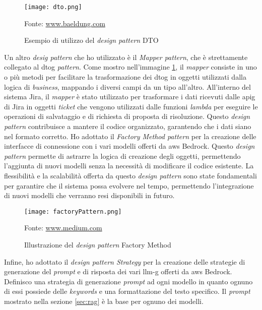 \begin{figure}[H]
    \centering
    \texttt{[image: dto.png]}
    \caption{Esempio di utilizzo del \textit{design pattern} DTO}
    \small Fonte: \href{https://www.baeldung.com/java-dto-pattern} {www.baeldung.com}
    \label{fig:dto}
\end{figure}
\noindent
Un altro \textit{desig pattern} che ho utilizzato è il \textit{Mapper pattern}, che è strettamente collegato al \gls{dtog} \textit{pattern}.  Come mostro nell'immagine \ref{fig:dto}, il \textit{mapper} consiste in uno o più metodi per facilitare la trasformazione dei \gls{dtog} in oggetti utilizzati dalla logica di \textit{business}, mappando i diversi campi da un tipo all’altro. All'interno del sistema Jira, il \textit{mapper} è stato utilizzato per trasformare i dati ricevuti dalle \gls{apig} di Jira in oggetti \textit{ticket} che vengono utilizzati dalle funzioni \textit{lambda} per eseguire le operazioni di salvataggio e di richiesta di proposta di risoluzione.
Questo \textit{design pattern} contribuisce a mantere il codice organizzato, garantendo che i dati siano nel formato corretto. Ho adottato il \textit{Factory Method pattern} per la creazione delle interfacce di connessione con i vari modelli offerti da \gls{aws} Bedrock. Questo \textit{design pattern} permette di astrarre la logica di creazione degli oggetti, permettendo l'aggiunta di nuovi modelli senza la necessità di modificare il codice esistente. La flessibilità e la scalabilità
offerta da questo \textit{design pattern} sono state fondamentali per garantire che il sistema possa evolvere nel tempo, permettendo l'integrazione di nuovi modelli che verranno resi disponibili in futuro. 
\begin{figure}[H]
    \centering
    \texttt{[image: factoryPattern.png]}
    \caption{Illustrazione del \textit{design pattern} Factory Method}
    \small Fonte: \href{https://medium.com/@contactkumaramit9139/factory-design-pattern-in-java-baee365fc1ce} {www.medium.com}
    \label{fig:factory}
\end{figure}
\noindent
Infine, ho adottato il \textit{design pattern Strategy} per la creazione delle strategie di generazione del \textit{prompt} e di risposta dei vari \gls{llm-g} offerti da \gls{aws} Bedrock. Definisco una strategia di generazione \textit{prompt} ad ogni modello in quanto ognuno di essi possiede delle \textit{keywords} e una formattazione del testo specifico. Il \textit{prompt} mostrato nella sezione \ref{sec:rag} è la base per ognuno dei modelli. 

